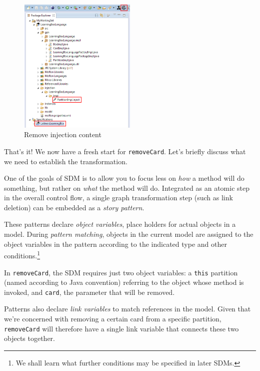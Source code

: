 \newpage

\begin{figure}[htbp]
	\centering
    \includegraphics[width=0.5\textwidth]{../../org.moflon.doc.handbook.03_storyDiagrams/03_removeCard/splashImages/eclipse_removeInjection}
	\caption{Remove injection content}
	\label{eclipse:delete_injection}
\end{figure}

\vspace{1cm}

That's it! We now have a fresh start for \texttt{removeCard}. Let's briefly discuss what we need to establish the transformation.

One of the goals of SDM is to allow you to focus less on \emph{how} a method will do something, but rather on \emph{what} the method will do.
Integrated as an atomic step in the overall control flow, a single graph transformation step (such as link deletion) can be embedded as a
\emph{story pattern}.

These patterns declare \emph{object variables}, place holders for actual objects in a model. During \emph{pattern matching}, objects
in the current model are assigned to the object variables in the pattern according to the indicated type and other conditions.\footnote{We shall learn what
further conditions may be specified in later SDMs.}

\clearpage

In \texttt{removeCard}, the SDM requires just two object variables: a \texttt{this} partition (named according to Java convention) referring to the
object whose method is invoked, and \texttt{card}, the parameter that will be removed.

Patterns also declare \emph{link variables} to match references in the model. Given that
we're concerned with removing a certain card from a specific partition, \texttt{removeCard} will therefore have a single link variable that connects these two
objects together.

